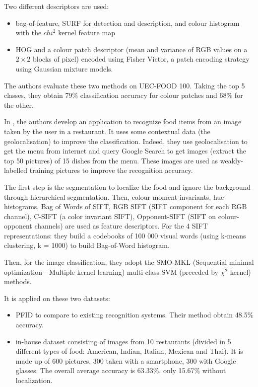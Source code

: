Two different descriptors are used:
\begin{itemize}
    \item bag-of-feature, SURF for detection and description, and colour histogram with the $chi^2$ kernel feature map
    \item HOG and a colour patch descriptor (mean and variance of RGB values on a $2 \times 2$ blocks of pixel) encoded using Fisher Victor, a patch encoding strategy using Gaussian mixture models.
\end{itemize}
The authors evaluate these two methods on UEC-FOOD 100. Taking the top 5 classes, they obtain 79\% classification accuracy for colour patches and 68\% for the other.


In \cite{Bettadapura2015}, the authors develop an application to recognize food items from an image taken by the user in a restaurant. It uses some contextual data (the geolocalisation) to improve the classification. Indeed, they use geolocalisation to get the menu from internet and query Google Search to get images (extract the top 50 pictures) of 15 dishes from the menu. These images are used as weakly-labelled training pictures to improve the recognition accuracy.

The first step is the segmentation to localize the food and ignore the background through hierarchical segmentation. Then, colour moment invariants, hue histograms, Bag of Words of SIFT, RGB SIFT (SIFT component for each RGB channel), C-SIFT (a color invariant SIFT), Opponent-SIFT (SIFT on colour-opponent channels) are used as feature descriptors. For the 4 SIFT representations: they build a codebooks of 100 000 visual words (using k-means clustering, k = 1000) to build Bag-of-Word histogram.

Then, for the image classification, they adopt the SMO-MKL (Sequential minimal optimization - Multiple kernel learning) multi-class SVM (preceded by $\chi^2$ kernel) methods.

It is applied on these two datasets:
\begin{itemize}
    \item PFID to compare to existing recognition systems. Their method obtain 48.5\% accuracy.
    
    \item in-house dataset consisting of images from 10 restaurants (divided in 5 different types of food: American, Indian, Italian, Mexican and Thai). It is made up of 600 pictures, 300 taken with a smartphone, 300 with Google glasses. The overall average accuracy is 63.33\%, only 15.67\% without localization.
\end{itemize}